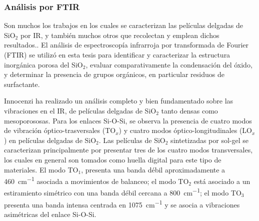 	    \subsubsection{Análisis por FTIR}\label{sec:Analisis_IR}

		 Son muchos los trabajos en los cuales se caracterizan las películas delgadas de SiO$_2$ por IR\cite{Olsen1989,Almeida1990,Redol1997,Innocenzi2003}, y también muchos otros que recolectan y emplean dichos resultados.\cite{Angelome2008,Calvo2008,Calvo20210}.
		 El análisis de espectroscopía infrarroja por transformada de Fourier (FTIR) se utilizó en esta tesis para identificar y caracterizar la estructura inorgánica porosa del SiO$_2$, evaluar comparativamente la condensación del óxido, y determinar la presencia de grupos orgánicos, en particular residuos de surfactante. 

		Innocenzi ha realizado un análisis completo y bien fundamentado sobre las vibraciones en el IR, de películas delgadas de SiO$_2$ tanto densas como mesoporososas.\cite{Innocenzi2003} Para los enlaces Si-O-Si, se observa la presencia de cuatro modos de vibración óptico-trasversales (TO$_x$) y cuatro modos óptico-longitudinales (LO$_x$) en películas delgadas de SiO$_2$. Las películas de SiO$_2$ sintetizadas por sol-gel se caracterizan principalmente por presentar tres de los cuatro modos transversales, los cuales en general son tomados como huella digital para este tipo de materiales.\cite{Innocenzi2003,Angelome2008,Calvo2008} El modo TO$_1$, presenta una banda débil aproximadamente a \SI{460}{\cm^{-1}} asociada a movimientos de balanceo; el modo TO$_2$ está asociado a un estiramiento simétrico con una banda débil cercana a \SI{800}{\cm^{-1}}; el modo TO$_3$ presenta una banda intensa centrada en \SI{1075}{\cm^{-1}} y se asocia a vibraciones asimétricas del enlace Si-O-Si. 

